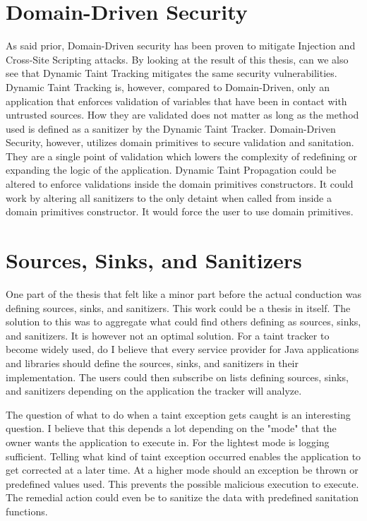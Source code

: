 \section{Domain-Driven Security}
\label{security}
As said prior, Domain-Driven security has been proven to mitigate Injection and Cross-Site Scripting attacks. By looking at the result of this thesis, can we also see that Dynamic Taint Tracking mitigates the same security vulnerabilities. Dynamic Taint Tracking is, however, compared to Domain-Driven, only an application that enforces validation of variables that have been in contact with untrusted sources. How they are validated does not matter as long as the method used is defined as a sanitizer by the Dynamic Taint Tracker. Domain-Driven Security, however, utilizes domain primitives to secure validation and sanitation. They are a single point of validation which lowers the complexity of redefining or expanding the logic of the application. Dynamic Taint Propagation could be altered to enforce validations inside the domain primitives constructors. It could work by altering all sanitizers to the only detaint when called from inside a domain primitives constructor. It would force the user to use domain primitives.



\section{Sources, Sinks, and Sanitizers}
\label{sss}
One part of the thesis that felt like a minor part before the actual conduction was defining sources, sinks, and sanitizers. This work could be a thesis in itself. The solution to this was to aggregate what could find others defining as sources, sinks, and sanitizers. It is however not an optimal solution. For a taint tracker to become widely used, do I believe that every service provider for Java applications and libraries should define the sources, sinks, and sanitizers in their implementation. The users could then subscribe on lists defining sources, sinks, and sanitizers depending on the application the tracker will analyze.

The question of what to do when a taint exception gets caught is an interesting question. I believe that this depends a lot depending on the "mode" that the owner wants the application to execute in. For the lightest mode is logging sufficient. Telling what kind of taint exception occurred enables the application to get corrected at a later time. At a higher mode should an exception be thrown or predefined values used. This prevents the possible malicious execution to execute. The remedial action could even be to sanitize the data with predefined sanitation functions. 

